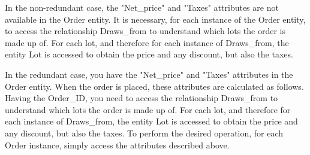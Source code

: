 In the non-redundant case, the "Net\_price" and "Taxes" attributes are not available in the Order entity. It is necessary, for each instance of the Order entity, to access the relationship Draws\_from to understand which lots the order is made up of. For each lot, and therefore for each instance of Draws\_from, the entity Lot is accessed to obtain the price and any discount, but also the taxes.

In the redundant case, you have the "Net\_price" and "Taxes" attributes in the Order entity. When the order is placed, these attributes are calculated as follows. Having the Order\_ID, you need to access the relationship Draws\_from to understand which lots the order is made up of. For each lot, and therefore for each instance of Draws\_from, the entity Lot is accessed to obtain the price and any discount, but also the taxes. To perform the desired operation, for each Order instance, simply access the attributes described above.














